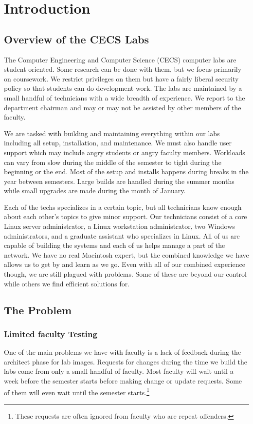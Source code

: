 \chapter{Introduction} \label{ch:introduction}
\section{Overview of the CECS Labs}
The Computer Engineering and Computer Science (CECS) computer labs are student oriented.  Some research can be done with them, but we focus primarily on coursework.  We restrict privileges on them but have a fairly liberal security policy so that students can do development work.  The labs are maintained by a small handful of technicians with a wide breadth of experience.  We report to the department chairman and may or may not be assisted by other members of the faculty. 

We are tasked with building and maintaining everything within our labs including all setup, installation, and maintenance.  We must also handle user support which may include angry students or angry faculty members.  Workloads can vary from slow during the middle of the semester to tight during the beginning or the end.  Most of the setup and installs happens during breaks in the year between semesters.  Large builds are handled during the summer months while small upgrades are made during the month of January.  

Each of the techs specializes in a certain topic, but all technicians know enough about each other's topics to give minor support.  Our technicians consist of a core Linux server administrator, a Linux workstation administrator, two Windows administrators, and a graduate assistant who specializes in Linux.  All of us are capable of building the systems and each of us helps manage a part of the network.  We have no real Macintosh expert, but the combined knowledge we have allows us to get by and learn as we go.  Even with all of our combined experience though, we are still plagued with problems.  Some of these are beyond our control while others we find efficient solutions for. 

\section{The Problem} \label{sec:the_problem}
\subsection{Limited faculty Testing}
One of the main problems we have with faculty is a lack of feedback during the architect phase for lab images.  Requests for changes during the time we build the labs come from only a small handful of faculty.  Most faculty will wait until a week before the semester starts before making change or update requests.  Some of them will even wait until the semester starts.\footnote{These requests are often ignored from faculty who are repeat offenders.}  

